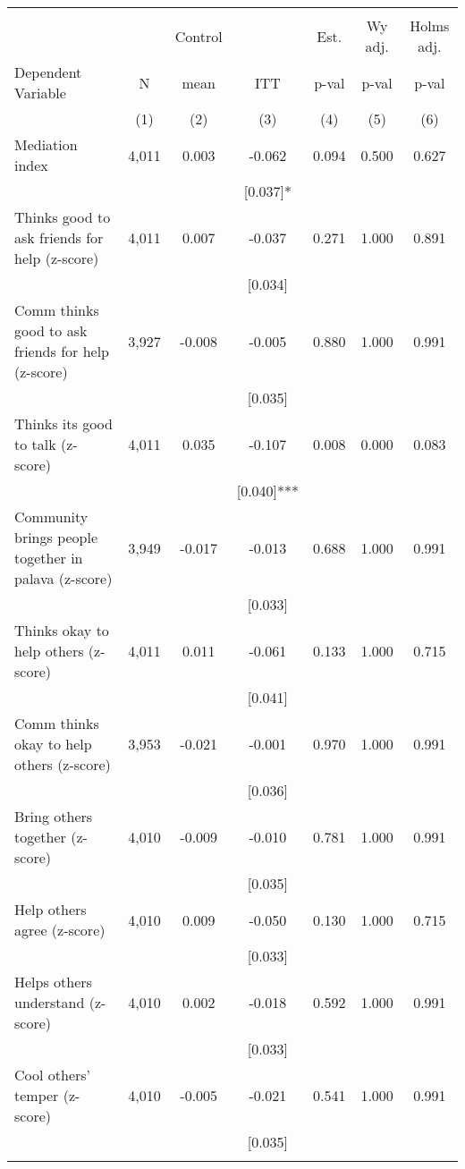 \begin{tabular}{lcccccc}
\hline \noalign{\smallskip} &  &  &  &  &  & \\
 &  & Control &  & Est. & Wy adj. & Holms adj.\\
Dependent Variable & N & mean & ITT & p-val & p-val & p-val\\
 & (1) & (2) & (3) & (4) & (5) & (6)\\
\noalign{\smallskip}\hline \noalign{\smallskip}Mediation index & 4,011 & 0.003 & -0.062 & 0.094 & 0.500 & 0.627\\
 &  &  & [0.037]* &  &  & \\
\quad Thinks good to ask friends for help (z-score) & 4,011 & 0.007 & -0.037 & 0.271 & 1.000 & 0.891\\
 &  &  & [0.034] &  &  & \\
\quad Comm thinks good to ask friends for help (z-score) & 3,927 & -0.008 & -0.005 & 0.880 & 1.000 & 0.991\\
 &  &  & [0.035] &  &  & \\
\quad Thinks its good to talk (z-score) & 4,011 & 0.035 & -0.107 & 0.008 & 0.000 & 0.083\\
 &  &  & [0.040]*** &  &  & \\
\quad Community brings people together in palava (z-score) & 3,949 & -0.017 & -0.013 & 0.688 & 1.000 & 0.991\\
 &  &  & [0.033] &  &  & \\
\quad Thinks okay to help others (z-score) & 4,011 & 0.011 & -0.061 & 0.133 & 1.000 & 0.715\\
 &  &  & [0.041] &  &  & \\
\quad Comm thinks okay to help others (z-score) & 3,953 & -0.021 & -0.001 & 0.970 & 1.000 & 0.991\\
 &  &  & [0.036] &  &  & \\
\quad Bring others together (z-score) & 4,010 & -0.009 & -0.010 & 0.781 & 1.000 & 0.991\\
 &  &  & [0.035] &  &  & \\
\quad Help others agree (z-score) & 4,010 & 0.009 & -0.050 & 0.130 & 1.000 & 0.715\\
 &  &  & [0.033] &  &  & \\
\quad Helps others understand (z-score) & 4,010 & 0.002 & -0.018 & 0.592 & 1.000 & 0.991\\
 &  &  & [0.033] &  &  & \\
\quad Cool others' temper (z-score) & 4,010 & -0.005 & -0.021 & 0.541 & 1.000 & 0.991\\
 &  &  & [0.035] &  &  & \\
\noalign{\smallskip}\hline\end{tabular}
